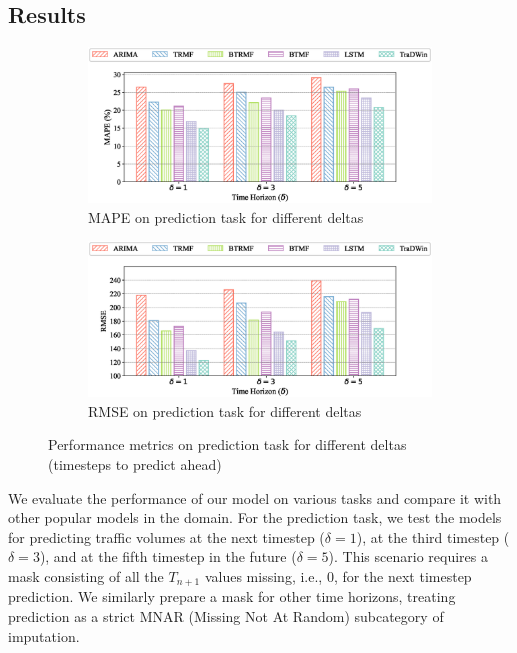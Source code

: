 \subsection{Results}

\begin{figure}[]
  \centering
  \begin{subfigure}[b]{0.9\textwidth}
      \centering
      \includegraphics[width=\textwidth]{mape_pred.eps}
      \caption{MAPE on prediction task for different deltas}
      \label{fig:mape_pred}
  \end{subfigure}
  
  \begin{subfigure}[b]{0.9\textwidth}
      \centering
      \includegraphics[width=\textwidth]{rmse_pred.eps}
      \caption{RMSE on prediction task for different deltas}
      \label{fig:rmse_pred}
  \end{subfigure}
  
  \caption{Performance metrics on prediction task for different deltas (timesteps to predict ahead)}
  \label{fig:pred_metrics}
\end{figure}

We evaluate the performance of our model on various tasks and compare it with other popular models in the domain. For the prediction task, we test the models for predicting traffic volumes at the next timestep (\(\delta = 1\)), at the third timestep (\(\delta = 3\)), and at the fifth timestep in the future (\(\delta = 5\)). This scenario requires a mask consisting of all the \(T_{n+1}\) values missing, i.e., 0, for the next timestep prediction. We similarly prepare a mask for other time horizons, treating prediction as a strict MNAR (Missing Not At Random) subcategory of imputation.

